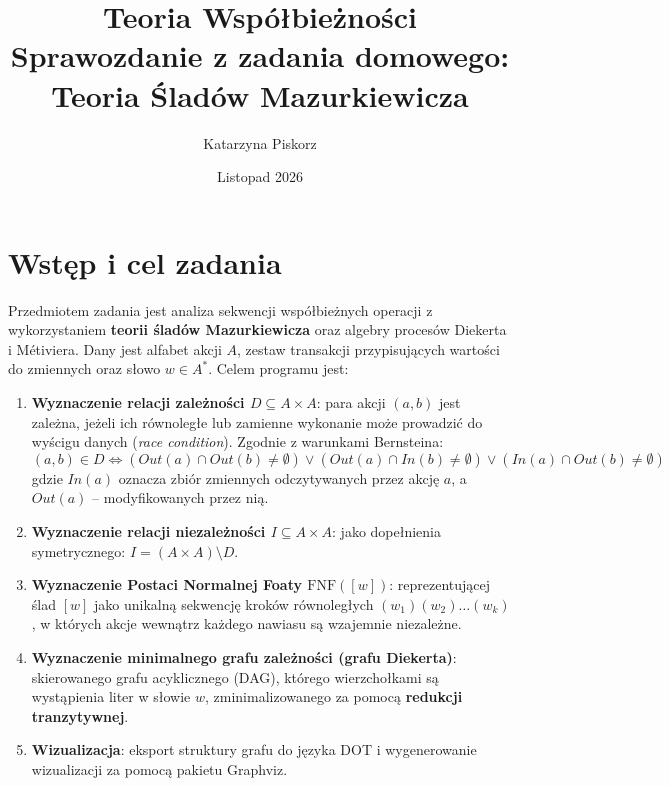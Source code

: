 \documentclass[a4paper,11pt]{article}
\title{\textbf{Teoria Współbieżności}\\Sprawozdanie z zadania domowego: Teoria Śladów Mazurkiewicza}
\author{Katarzyna Piskorz}
\date{Listopad 2026}
\begin{document}
\maketitle

\section{Wstęp i cel zadania}
Przedmiotem zadania jest analiza sekwencji współbieżnych operacji z wykorzystaniem \textbf{teorii śladów Mazurkiewicza} oraz algebry procesów Diekerta i Métiviera. 
Dany jest alfabet akcji $A$, zestaw transakcji przypisujących wartości do zmiennych oraz słowo $w \in A^*$. Celem programu jest:
\begin{enumerate}
    \item \textbf{Wyznaczenie relacji zależności $D \subseteq A \times A$}: para akcji $(a, b)$ jest zależna, jeżeli ich równoległe lub zamienne wykonanie może prowadzić do wyścigu danych (\textit{race condition}). Zgodnie z warunkami Bernsteina:
    \[
    (a, b) \in D \iff (Out(a) \cap Out(b) \neq \emptyset) \lor (Out(a) \cap In(b) \neq \emptyset) \lor (In(a) \cap Out(b) \neq \emptyset)
    \]
    gdzie $In(a)$ oznacza zbiór zmiennych odczytywanych przez akcję $a$, a $Out(a)$ -- modyfikowanych przez nią.
    \item \textbf{Wyznaczenie relacji niezależności $I \subseteq A \times A$}: jako dopełnienia symetrycznego: $I = (A \times A) \setminus D$.
    \item \textbf{Wyznaczenie Postaci Normalnej Foaty $\text{FNF}([w])$}: reprezentującej ślad $[w]$ jako unikalną sekwencję kroków równoległych $(w_1)(w_2)\dots(w_k)$, w których akcje wewnątrz każdego nawiasu są wzajemnie niezależne.
    \item \textbf{Wyznaczenie minimalnego grafu zależności (grafu Diekerta)}: skierowanego grafu acyklicznego (DAG), którego wierzchołkami są wystąpienia liter w słowie $w$, zminimalizowanego za pomocą \textbf{redukcji tranzytywnej}.
    \item \textbf{Wizualizacja}: eksport struktury grafu do języka DOT i wygenerowanie wizualizacji za pomocą pakietu Graphviz.
\end{enumerate}
\end{document}
